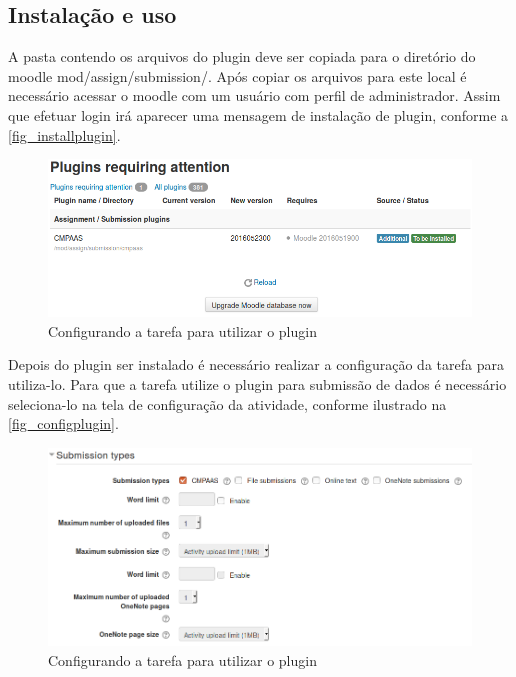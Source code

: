 \documentclass[
	12pt,				%
	openright,			%
	oneside,			%
	a4paper,			%
	english,			%
	french,				%
	spanish,			%
	brazil				%
	]{abntex2}
\begin{document}
\subsection{Instalação e uso}
A pasta contendo os arquivos do plugin deve ser copiada para o diretório do moodle mod/assign/submission/. Após copiar os arquivos para este local é necessário acessar o moodle com um usuário com perfil de administrador. Assim que efetuar login irá aparecer uma mensagem de instalação de plugin, conforme a \autoref{fig_installplugin}.
\begin{figure}[htb]
	\caption{\label{fig_installplugin} Configurando a tarefa para utilizar o plugin}
	\begin{center}
		\includegraphics[scale=0.4]{installplugin.png}
	\end{center}
\end{figure}

Depois do plugin ser instalado é necessário realizar a configuração da tarefa para utiliza-lo. Para que a tarefa utilize o plugin para submissão de dados é necessário seleciona-lo na tela de configuração da atividade, conforme ilustrado na \autoref{fig_configplugin}.

\begin{figure}[htb]
	\caption{\label{fig_configplugin} Configurando a tarefa para utilizar o plugin}
	\begin{center}
		\includegraphics[scale=0.4]{configplugin.png}
	\end{center}
\end{figure}
\end{document}

